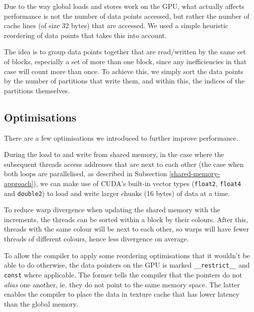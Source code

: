 Due to the way global loads and stores work on the GPU, what actually affects
performance is not the number of data points accessed, but rather the number of
cache lines (of size 32 bytes) that are accessed. We used a simple heuristic
reordering of data points that takes this into account.

The idea is to group data points together that are read/written by the same set
of blocks, especially a set of more than one block, since any inefficiencies in
that case will count more than once. To achieve this, we simply sort the data
points by the number of partitions that write them, and within this, the indices
of the partitions themselves.

\subsection{Optimisations}\label{optimisations}

There are a few optimisations we introduced to further improve performance.

During the load to and write from shared memory, in the case where the
subsequent threads access addresses that are next to each other (the case when
both loops are parallelised, as described in Subsection
\ref{shared-memory-approach}), we can make use of CUDA's built-in vector
types (\lstinline!float2!, \lstinline!float4! and \lstinline!double2!) to load
and write larger chunks (16 bytes) of data at a time.

To reduce warp divergence when updating the shared memory with the increments,
the threads can be sorted within a block by their colours. After this, threads
with the same colour will be next to each other, so warps will have fewer threads
of different colours, hence less divergence on average.

To allow the compiler to apply some reordering optimisations that it wouldn't be
able to do otherwise, the data pointers on the GPU is marked
\lstinline!__restrict__! and \lstinline!const! where applicable. The former
tells the compiler that the pointers do not \emph{alias} one another, ie. they
do not point to the same memory space. The latter enables the compiler to place
the data in texture cache that has lower latency than the global memory.

